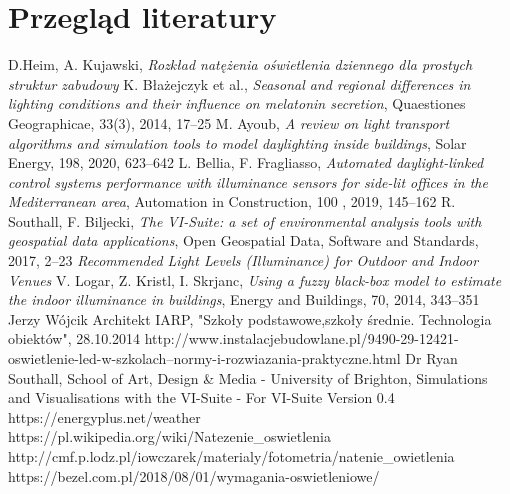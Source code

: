 \documentclass[a4paper,12pt]{article}
\begin{document}
	\section{Przegląd literatury}
	\label{sec:przeglad_literatury}
	\begin{thebibliography}{7}
		D.Heim, A. Kujawski, \textit{Rozkład natężenia oświetlenia dziennego dla prostych struktur zabudowy}
		K. Błażejczyk et al., \textit{Seasonal and regional differences in lighting conditions and their influence on melatonin secretion}, Quaestiones Geographicae, 33(3), 2014, 17--25
		M. Ayoub, \textit{A review on light transport algorithms and simulation tools to model daylighting inside buildings}, Solar Energy, 198, 2020, 623--642
		L. Bellia, F. Fragliasso, \textit{Automated daylight-linked control systems performance with illuminance sensors for side-lit offices in the Mediterranean area}, Automation in Construction, 100 , 2019, 145--162
		R. Southall, F. Biljecki, \textit{The VI-Suite: a set of environmental analysis tools with geospatial data applications}, Open Geospatial Data, Software and Standards, 2017, 2--23
		\textit{Recommended Light Levels (Illuminance) for Outdoor and Indoor Venues}
		V. Logar, Z. Kristl, I. Skrjanc, \textit{Using a fuzzy black-box model to estimate the indoor illuminance in buildings}, Energy and Buildings, 70, 2014, 343--351
		Jerzy Wójcik Architekt IARP, "Szkoły podstawowe,szkoły średnie. Technologia obiektów", 28.10.2014
		http://www.instalacjebudowlane.pl/9490-29-12421-oswietlenie-led-w-szkolach--normy-i-rozwiazania-praktyczne.html
		Dr Ryan Southall, School of Art, Design \& Media - University of Brighton, Simulations and Visualisations with the VI-Suite - For VI-Suite Version 0.4
		https://energyplus.net/weather
		https://pl.wikipedia.org/wiki/Natezenie\_oswietlenia
		http://cmf.p.lodz.pl/iowczarek/materialy/fotometria/natenie\_owietlenia
		https://bezel.com.pl/2018/08/01/wymagania-oswietleniowe/	
	\end{thebibliography}
	
\end{document}
